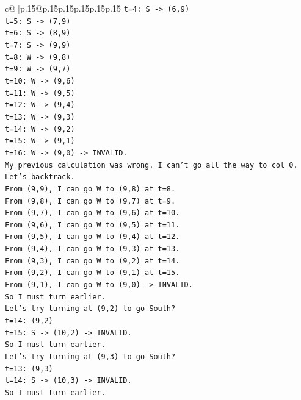 \documentclass{article}
\begin{document}
{\begin{supertabular}{c@{$\;$}|p{.15\linewidth}@{}p{.15\linewidth}p{.15\linewidth}p{.15\linewidth}p{.15\linewidth}p{.15\linewidth}}
{{{\texttt{t=4: S {-}> (6,9)} \\
\texttt{t=5: S {-}> (7,9)} \\
\texttt{t=6: S {-}> (8,9)} \\
\texttt{t=7: S {-}> (9,9)} \\
\texttt{t=8: W {-}> (9,8)} \\
\texttt{t=9: W {-}> (9,7)} \\
\texttt{t=10: W {-}> (9,6)} \\
\texttt{t=11: W {-}> (9,5)} \\
\texttt{t=12: W {-}> (9,4)} \\
\texttt{t=13: W {-}> (9,3)} \\
\texttt{t=14: W {-}> (9,2)} \\
\texttt{t=15: W {-}> (9,1)} \\
\texttt{t=16: W {-}> (9,0) {-}> INVALID.} \\
\texttt{My previous calculation was wrong. I can't go all the way to col 0.} \\
\texttt{Let's backtrack.} \\
\texttt{From (9,9), I can go W to (9,8) at t=8.} \\
\texttt{From (9,8), I can go W to (9,7) at t=9.} \\
\texttt{From (9,7), I can go W to (9,6) at t=10.} \\
\texttt{From (9,6), I can go W to (9,5) at t=11.} \\
\texttt{From (9,5), I can go W to (9,4) at t=12.} \\
\texttt{From (9,4), I can go W to (9,3) at t=13.} \\
\texttt{From (9,3), I can go W to (9,2) at t=14.} \\
\texttt{From (9,2), I can go W to (9,1) at t=15.} \\
\texttt{From (9,1), I can go W to (9,0) {-}> INVALID.} \\
\texttt{So I must turn earlier.} \\
\texttt{Let's try turning at (9,2) to go South?} \\
\texttt{t=14: (9,2)} \\
\texttt{t=15: S {-}> (10,2) {-}> INVALID.} \\
\texttt{So I must turn earlier.} \\
\texttt{Let's try turning at (9,3) to go South?} \\
\texttt{t=13: (9,3)} \\
\texttt{t=14: S {-}> (10,3) {-}> INVALID.} \\
\texttt{So I must turn earlier.} \\
}}}
\end{supertabular}}
\end{document}
